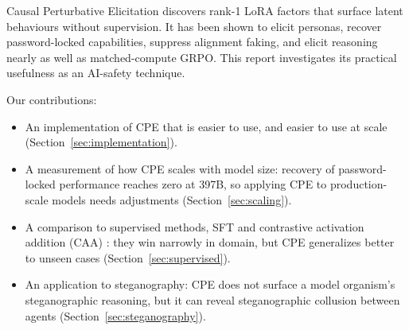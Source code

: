 Causal Perturbative Elicitation \citep{mack2026} discovers rank-1 LoRA factors that surface latent behaviours without supervision.
It has been shown to elicit personas, recover password-locked capabilities, suppress alignment faking, and elicit reasoning nearly as well as matched-compute GRPO.
This report investigates its practical usefulness as an AI-safety technique.

Our contributions:
\begin{itemize}
\item An implementation of CPE that is easier to use, and easier to use at scale (Section~\ref{sec:implementation}).
\item A measurement of how CPE scales with model size: recovery of password-locked performance reaches zero at 397B, so applying CPE to production-scale models needs adjustments (Section~\ref{sec:scaling}).
\item A comparison to supervised methods, SFT and contrastive activation addition (CAA) \citep{panickssery2024}: they win narrowly in domain, but CPE generalizes better to unseen cases (Section~\ref{sec:supervised}).
\item An application to steganography: CPE does not surface a model organism's steganographic reasoning, but it can reveal steganographic collusion between agents (Section~\ref{sec:steganography}).
\end{itemize}
